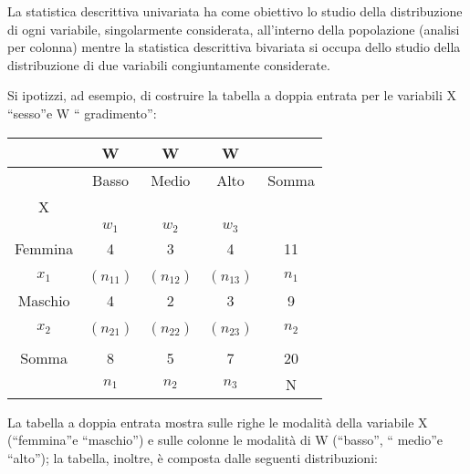 \vspace{12pt}
La statistica descrittiva univariata ha come obiettivo lo studio della 
distribuzione di ogni variabile, singolarmente considerata, all'interno 
della popolazione (analisi per colonna) mentre la statistica descrittiva 
bivariata si occupa dello studio della distribuzione di due variabili 
congiuntamente considerate.

Si ipotizzi, ad esempio, di costruire la tabella a doppia entrata per le 
variabili X \textquotedblleft sesso\textquotedblright e W \textquotedblleft 
gradimento\textquotedblright:

\begin{tabular}{|c|c|c|c|c|}
\hline
 & W & W & W & \\
\hline
 & Basso & Medio & Alto & Somma\\
X &  & & &\\
 & \(w_1\) & \(w_2\) &  \(w_3\) & \\
 \hline
 Femmina & 4 & 3 & 4 & 11\\
   &  & & &\\
 \(x_1\) & \((n_{11})\) & \((n_{12})\) &  \((n_{13})\) & \(n_1\) \\
  \hline
   Maschio & 4 & 2 & 3 & 9\\
   &  & & &\\
   \(x_2\) & \((n_{21})\) & \((n_{22})\) &  \((n_{23})\) & \(n_2\) \\
   \hline
 &  &  &  & \\
 Somma  & 8 & 5& 7&20\\
    & \(n_{1}\) & \(n_{2}\) &  \(n_{3}\) & N \\   
  
  \hline
\end{tabular}

\vspace{6pt}
La tabella a doppia entrata mostra sulle righe le modalità della 
variabile X (\textquotedblleft femmina\textquotedblright e 
\textquotedblleft maschio\textquotedblright) e sulle colonne le modalità di 
W (\textquotedblleft basso\textquotedblright, \textquotedblleft 
medio\textquotedblright e \textquotedblleft alto\textquotedblright); la 
tabella, inoltre, è composta dalle seguenti distribuzioni:  

